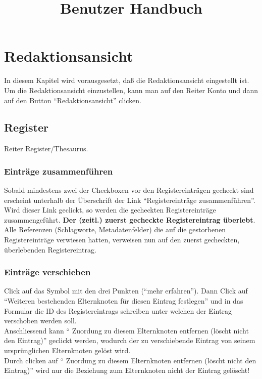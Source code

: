 \documentclass[a4paper,10pt]{article}
\title{Benutzer Handbuch}
\author{}
\date{}
\begin{document}
\maketitle
\tableofcontents
\newpage

\section{Redaktionsansicht}
In diesem Kapitel wird vorausgesetzt, daß die Redaktionsansicht eingestellt ist. Um die Redaktionsansicht einzustellen, kann man auf den Reiter Konto und dann auf den Button ``Redaktionsansicht'' clicken.

\subsection{Register}
Reiter Register\slash Thesaurus.

\subsubsection{Einträge zusammenführen}
Sobald mindestens zwei der Checkboxen vor den Registereinträgen gecheckt sind erscheint unterhalb der Überschrift der Link ``Registereinträge zusammenführen''. 
Wird dieser Link geclickt, so werden die gecheckten Registereinträge zusammengeführt. \textbf{Der (zeitl.) zuerst gecheckte Registereintrag überlebt}.\\
Alle Referenzen (Schlagworte, Metadatenfelder) die auf die gestorbenen Registereinträge verwiesen hatten, verweisen nun auf den zuerst gecheckten, überlebenden Registereintrag.

\subsubsection{Einträge verschieben}
Click auf das Symbol mit den drei Punkten (``mehr erfahren''). Dann Click auf ``Weiteren bestehenden Elternknoten für diesen Eintrag festlegen'' und in das Formular die ID des Registereintrags schreiben unter welchen der Eintrag verschoben werden soll.\\
Anschliessend kann ``
Zuordung zu diesem Elternknoten entfernen (löscht nicht den Eintrag)'' geclickt werden, wodurch der zu verschiebende Eintrag von seinem ursprünglichen Elternknoten gelöst wird.\\
Durch clicken auf ``
Zuordung zu diesem Elternknoten entfernen (löscht nicht den Eintrag)'' wird nur die Beziehung zum Elternknoten nicht der Eintrag gelöscht!
\end{document}

